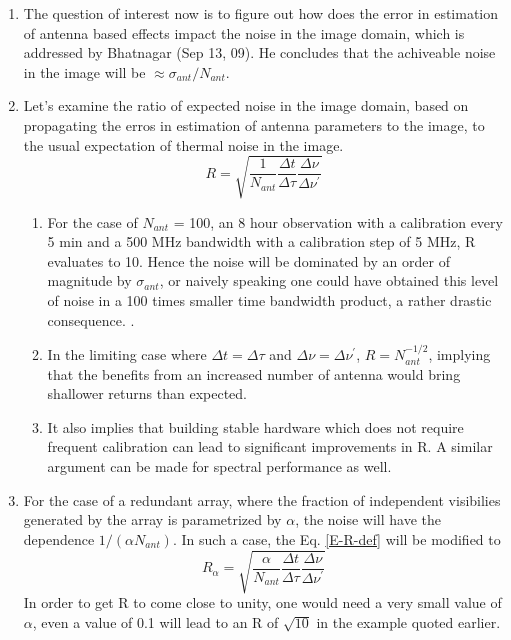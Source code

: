 \documentclass[11pt]{article}
\begin{document}
\begin{enumerate}
\item The question of interest now is to figure out how does the error in estimation of antenna based effects impact the noise in the image domain, which is addressed by Bhatnagar (Sep 13, 09).
He concludes that the achiveable noise in the image will be $\approx \sigma_{ant}/N_{ant}$.
\item Let's examine the ratio of expected noise in the image domain, based on propagating the erros in estimation of antenna parameters to the image, to the usual expectation of thermal noise in the image.
\begin{equation}
R = \sqrt{\frac{1}{N_{ant}} \frac{ \Delta t}{\Delta \tau} \frac{\Delta \nu}{\Delta \nu^{\prime}}}
\label{E-R-def}
\end{equation}
\begin{enumerate}
\item For the case of $N_{ant}$ = 100, an 8 hour observation with a calibration every 5 min and a 500 MHz bandwidth with a calibration step of 5 MHz, R evaluates to 10. 
Hence the noise will be dominated by an order of magnitude by $\sigma_{ant}$, or naively speaking one could have obtained this level of noise in a 100 times smaller time bandwidth product, a rather drastic consequence.
.
\item In the limiting case where $\Delta t = \Delta \tau$ and $\Delta \nu = \Delta \nu^{\prime}$, $R = N_{ant}^{-1/2}$, implying that the benefits from an increased number of antenna would bring shallower returns than expected.
\item It also implies that building stable hardware which does not require frequent calibration can lead to significant improvements in R. 
A similar argument can be made for spectral performance as well.
\end{enumerate}

\item For the case of a redundant array, where the fraction of independent visibilies generated by the array is parametrized by $\alpha$, the noise will 
have the dependence $1/(\alpha N_{ant})$. 
In such a case, the Eq. \ref{E-R-def} will be modified to
\begin{equation}
R_{\alpha} = \sqrt{\frac{\alpha}{N_{ant}} \frac{ \Delta t}{\Delta \tau} \frac{\Delta \nu}{\Delta \nu^{\prime}}}
\label{E-R1-def}
\end{equation}
In order to get R to come close to unity, one would need a very small value of $\alpha$, even a value of 0.1 will lead to an R of $\sqrt{10}$ in the example quoted earlier.
\end{enumerate}
\end{document}
